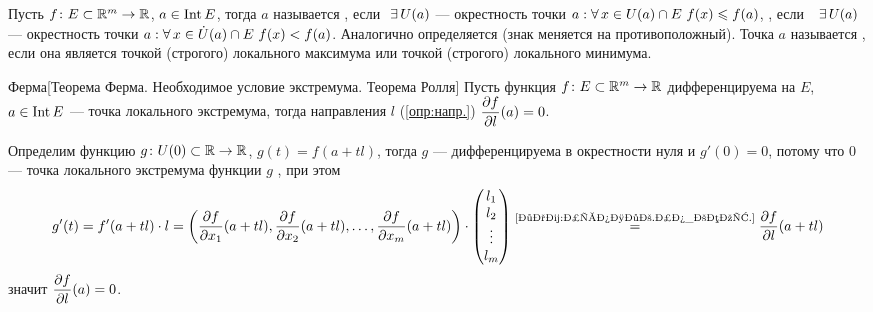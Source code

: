 \begin{opr}
	Пусть $f \colon E \subset \mathbb R^m \to \mathbb R$, $a \in \mathrm{Int}\, E$, тогда $a$ называется
	, если$\E U(a)$ --- окрестность точки $a : \forall \, x \in U(a) 
	\cap E\ f(x) \leqslant f(a)$,
	, если $\E U(a)$ --- окрестность точки $a : \forall \, x \in \dot U(a) \cap E\ f(x) < f(a)$. Аналогично определяется
	 (знак меняется на противоположный). Точка $a$ называется
	, если она является точкой (строгого) локального максимума или точкой (строгого) локального минимума.
\end{opr}

\begin{teor}[https://www.youtube.com/live/oGN0SkfpZME?si=IUuLLNxy2ax4nH0N&t=1300]{Ферма}[Теорема Ферма. Необходимое условие экстремума. Теорема Ролля]\label{ферма}%
	Пусть функция $f \colon E \subset \mathbb R^m \to \mathbb R$ дифференцируема \smallskip на $E$, $a \in \mathrm{Int}\, E$ --- точка локального экстремума, тогда \A направления $l$ (\ref{опр:напр.}) \small$\displaystyle\frac{\partial f}{\partial l}(a) = 0$. 
\end{teor}

\begin{prf}
	Определим функцию $g\colon U(0) \subset \mathbb R \to \mathbb R$, $g(t) = f(a + tl)$, тогда $g$ --- дифференцируема в окрестности нуля и $g'(0) = 0$, потому что $0$ --- точка локального экстремума функции $g$ , при этом 
	\[g'(t) = f'(a + tl) \cdot l = \left(\frac{\partial f}{\partial x_1}(a + tl), \frac{\partial f}{\partial x_2}(a + tl), \ldots, \frac{\partial f}{\partial x_m}(a + tl)\right) \cdot
	\begin{pmatrix} l_1 \\ l_2 \\ \vdots \\ l_m \end{pmatrix} \stackrel{\text{\ref{зам:произв.по_вект.}}}{=} \frac{\partial f}{\partial l}(a + tl)\]
	значит $\displaystyle\frac{\partial f}{\partial l}(a) = 0$.
\end{prf}

